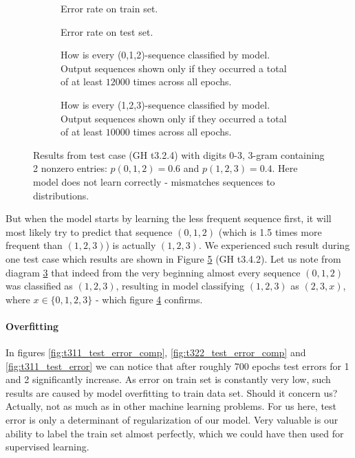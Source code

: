 \documentclass[declaration,shortabstract,lic,english]{iithesis}
\begin{document}
\begin{figure}[htb]
\begin{subfigure}[b]{.49\textwidth}
    \def\svgwidth{\textwidth}
    
    \caption{Error rate on train set.}
    \label{fig:t342_data_error}
\end{subfigure}
\begin{subfigure}[b]{.49\textwidth}
    \def\svgwidth{\textwidth}
    
    \caption{Error rate on test set.}
    \label{fig:t342_test_error}
\end{subfigure}
\begin{subfigure}[b]{.49\textwidth}
    \def\svgwidth{\textwidth}
    
    \caption{How is every (0,1,2)-sequence classified by model. Output sequences shown only if they occurred a total
    of at least $12000$ times across all epochs.}
    \label{fig:t342_predictions_012}
\end{subfigure}
\begin{subfigure}[b]{.49\textwidth}
    \def\svgwidth{\textwidth}
    
    \caption{How is every (1,2,3)-sequence classified by model. Output sequences shown only if they occurred a total
    of at least $10000$ times across all epochs.}
    \label{fig:t342_predictions_123}
\end{subfigure}
\caption{Results from test case (GH t3.2.4) with digits 0-3, 3-gram containing 2 nonzero entries: $p(0,1,2)=0.6$ and $p(1, 2, 3)=0.4$. Here model does not learn correctly - mismatches sequences to distributions.}
\label{fig:t342_results}
\end{figure}

But when the model starts by learning the less frequent sequence first, it will most likely try to predict that sequence $(0, 1, 2)$ (which is 1.5 times more frequent than $(1, 2, 3)$) is actually $(1, 2, 3)$. We experienced such result during one test case which results are shown in Figure \ref{fig:t342_results} (GH t3.4.2). Let us note from diagram \ref{fig:t342_predictions_012} that indeed from the very beginning almost every sequence $(0,1,2)$ was classified as $(1, 2, 3)$, resulting in model classifying $(1, 2, 3)$ as $(2, 3, x)$, where $x \in \lbrace0, 1, 2, 3\rbrace$ - which figure \ref{fig:t342_predictions_123} confirms. 

\paragraph{Overfitting} In figures \ref{fig:t311_test_error_comp}, \ref{fig:t322_test_error_comp} and \ref{fig:t311_test_error} we can notice that after roughly 700 epochs test errors for 1 and 2 significantly increase. As error on train set is constantly very low, such results are caused by model overfitting to train data set. Should it concern us? Actually, not as much as in other machine learning problems. For us here, test error is only a determinant of regularization of our model. Very valuable is our ability to label the train set almost perfectly, which we could have then used for supervised learning.
\end{document}
